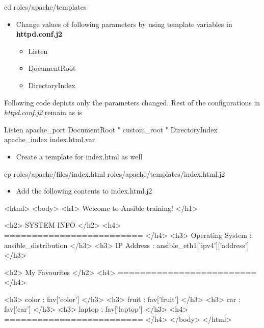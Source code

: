 \begin{code}
cd roles/apache/templates
\end{code}

\begin{itemize}
\item Change values of following  parameters by using template variables in \textbf{httpd.conf.j2}


\begin{itemize}
\item Listen
\item DocumentRoot
\item DirectoryIndex
\end{itemize}
\end{itemize}

Following code depicts only the parameters changed. Rest of the configurations in \emph{httpd.conf.j2} remain as is

\begin{code}
Listen {{ apache_port }}
DocumentRoot "{{ custom_root }}"
DirectoryIndex {{ apache_index }} index.html.var
\end{code}

\begin{itemize}
\item Create a template for index.html as well
\end{itemize}

\begin{code}
cp roles/apache/files/index.html roles/apache/templates/index.html.j2
\end{code}

\begin{itemize}
\item Add the following contents to index.html.j2
\end{itemize}

\begin{code}
<html>
<body>
  <h1>  Welcome to Ansible training! </h1>

  <h2> SYSTEM INFO </h2>
  <h4>  ========================= </h4>
  <h3> Operating System : {{ ansible_distribution }} </h3>
  <h3> IP Address : {{ ansible_eth1['ipv4']['address'] }} </h3>

  <h2>  My Favourites </h2>
  <h4>  ========================= </h4>

  <h3> color     : {{ fav['color'] }} </h3>
  <h3> fruit     : {{ fav['fruit']   }} </h3>
  <h3> car       : {{ fav['car']   }} </h3>
  <h3> laptop    : {{ fav['laptop']   }} </h3>
  <h4>  ========================= </h4>
</body>
</html>
\end{code}

